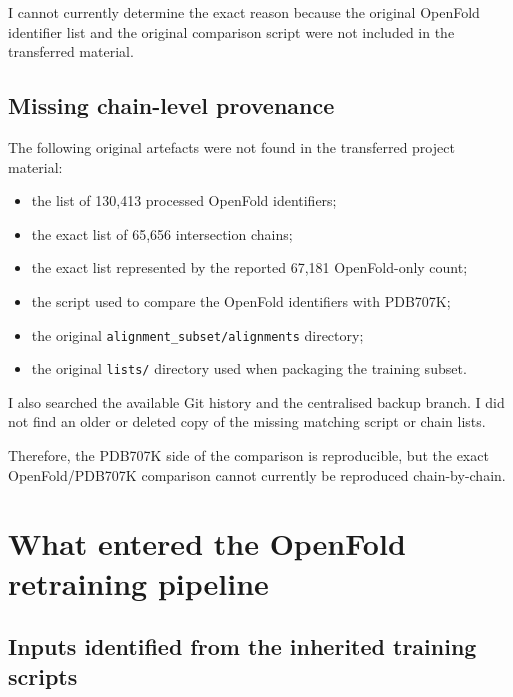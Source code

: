 \documentclass[11pt,a4paper]{article}
\begin{document}
I cannot currently determine the exact reason because the original OpenFold identifier list and the original comparison script were not included in the transferred material.


\subsection{Missing chain-level provenance}

The following original artefacts were not found in the transferred project material:

\begin{itemize}[leftmargin=*]

    \item the list of 130,413 processed OpenFold identifiers;

    \item the exact list of 65,656 intersection chains;

    \item the exact list represented by the reported 67,181 OpenFold-only count;

    \item the script used to compare the OpenFold identifiers with PDB707K;

    \item the original \texttt{alignment\_subset/alignments} directory;

    \item the original \texttt{lists/} directory used when packaging the training subset.

\end{itemize}

I also searched the available Git history and the centralised backup branch. I did not find an older or deleted copy of the missing matching script or chain lists.

Therefore, the PDB707K side of the comparison is reproducible, but the exact OpenFold/PDB707K comparison cannot currently be reproduced chain-by-chain.


\section{What entered the OpenFold retraining pipeline}

\subsection{Inputs identified from the inherited training scripts}
\end{document}
